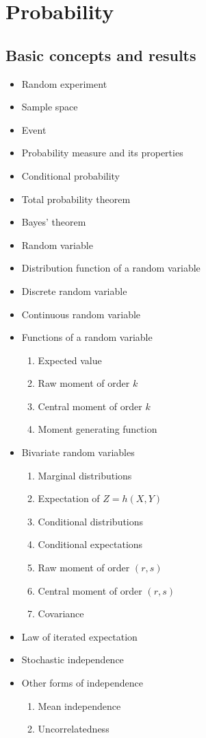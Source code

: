 \documentclass{report}
\begin{document}
\chapter{Probability}

\section{Basic concepts and results}

\begin{itemize}
    \item Random experiment
    \item Sample space
    \item Event
    \item Probability measure and its properties
    \item Conditional probability
    \item Total probability theorem
    \item Bayes' theorem
    \item Random variable
    \item Distribution function of a random variable
    \item Discrete random variable
    \item Continuous random variable
    \item Functions of a random variable
        \begin{enumerate}
            \item Expected value
            \item Raw moment of order $k$
            \item Central moment of order $k$
            \item Moment generating function
        \end{enumerate}
    \item Bivariate random variables
        \begin{enumerate}
            \item Marginal distributions
            \item Expectation of $Z = h(X,Y)$
            \item Conditional distributions
            \item Conditional expectations
            \item Raw moment of order $(r,s)$
            \item Central moment of order $(r,s)$
            \item Covariance
        \end{enumerate}
    \item Law of iterated expectation
    \item Stochastic independence
    \item Other forms of independence
        \begin{enumerate}
            \item Mean independence
            \item Uncorrelatedness
        \end{enumerate}
\end{itemize}
\end{document}
